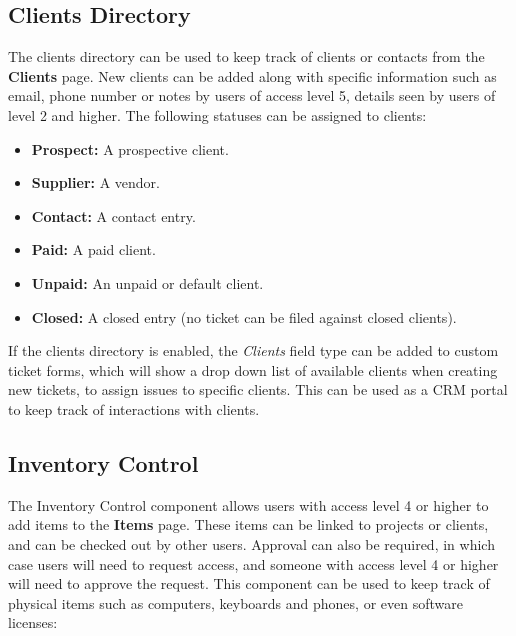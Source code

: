 \documentclass[11pt]{article}
\begin{document}
\subsection{Clients Directory}
The clients directory can be used to keep track of clients or contacts from the \textbf{Clients} page. New clients can be added along with specific information such as email, phone number or notes by users of access level 5, details seen by users of level 2 and higher. The following statuses can be assigned to clients:

\begin{itemize}
\item \textbf{Prospect:} A prospective client.
\item \textbf{Supplier:} A vendor.
\item \textbf{Contact:} A contact entry.
\item \textbf{Paid:} A paid client.
\item \textbf{Unpaid:} An unpaid or default client.
\item \textbf{Closed:} A closed entry (no ticket can be filed against closed clients).
\end{itemize}

If the clients directory is enabled, the \textit{Clients} field type can be added to custom ticket forms, which will show a drop down list of available clients when creating new tickets, to assign issues to specific clients. This can be used as a CRM portal to keep track of interactions with clients. 

\subsection{Inventory Control}
The Inventory Control component allows users with access level 4 or higher to add items to the \textbf{Items} page. These items can be linked to projects or clients, and can be checked out by other users. Approval can also be required, in which case users will need to request access, and someone with access level 4 or higher will need to approve the request. This component can be used to keep track of physical items such as computers, keyboards and phones, or even software licenses:
\end{document}
